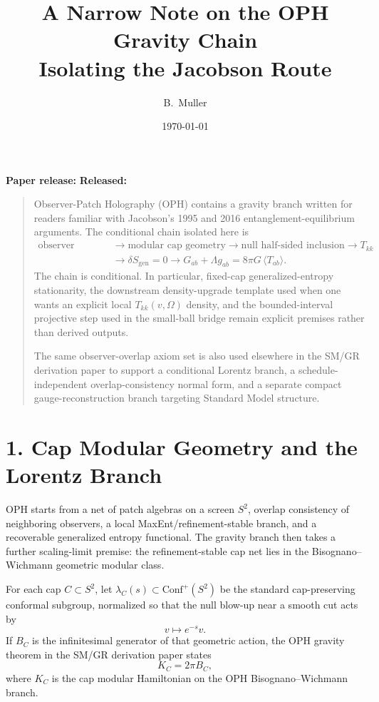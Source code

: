 \documentclass[10pt]{article}
\title{A Narrow Note on the OPH Gravity Chain\\[0.3em]\large Isolating the Jacobson Route}
\author{B.\ Muller}
\date{\today}
\newcommand{\Conf}{\mathrm{Conf}}
\begin{document}
\maketitle
\begin{center}
\small\textbf{Paper release:} \OPHPaperReleaseID\quad
\textbf{Released:} \OPHPaperReleaseDate
\end{center}

\begin{quote}\small
Observer-Patch Holography (OPH) contains a gravity branch written for readers familiar with Jacobson's 1995 and 2016 entanglement-equilibrium arguments. The conditional chain isolated here is
\[
\begin{aligned}
\text{observer overlap}
&\to \text{modular cap geometry}
\to \text{null half-sided inclusion}
\to T_{kk} \\
&\to \delta S_{\mathrm{gen}}=0
\to G_{ab}+\Lambda g_{ab}=8\pi G\,\langle T_{ab}\rangle.
\end{aligned}
\]
The chain is conditional. In particular, fixed-cap generalized-entropy stationarity, the downstream density-upgrade template used when one wants an explicit local \(T_{kk}(v,\Omega)\) density, and the bounded-interval projective step used in the small-ball bridge remain explicit premises rather than derived outputs.

The same observer-overlap axiom set is also used elsewhere in the SM/GR derivation paper to support a conditional Lorentz branch, a schedule-independent overlap-consistency normal form, and a separate compact gauge-reconstruction branch targeting Standard Model structure.
\end{quote}

\section*{1. Cap Modular Geometry and the Lorentz Branch}

OPH starts from a net of patch algebras on a screen \(S^2\), overlap consistency of neighboring observers, a local MaxEnt/refinement-stable branch, and a recoverable generalized entropy functional. The gravity branch then takes a further scaling-limit premise: the refinement-stable cap net lies in the Bisognano--Wichmann geometric modular class.

For each cap \(C \subset S^2\), let \(\lambda_C(s) \subset \Conf^+(S^2)\) be the standard cap-preserving conformal subgroup, normalized so that the null blow-up near a smooth cut acts by
\[
v \mapsto e^{-s} v.
\]
If \(B_C\) is the infinitesimal generator of that geometric action, the OPH gravity theorem in the SM/GR derivation paper states
\[
K_C = 2\pi B_C,
\]
where \(K_C\) is the cap modular Hamiltonian on the OPH Bisognano--Wichmann branch.
\end{document}
